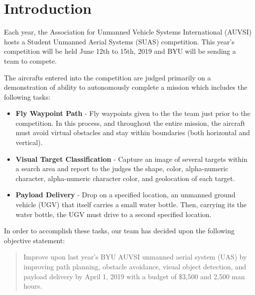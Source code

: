 \documentclass{auvsi_doc}
\begin{document}
\begin{AUVSITitlePage}
\begin{artifacttable}
\end{artifacttable}
\end{AUVSITitlePage}


\section{ Introduction}

Each year, the Association for Unmanned Vehicle Systems International (AUVSI) hosts a Student Unmanned Aerial Systems (SUAS) competition. This year’s competition will be held June 12th to 15th, 2019 and BYU will be sending a team to compete.

The aircrafts entered into the competition are judged primarily on a demonstration of ability to autonomously complete a mission which includes the following tasks:

\begin{itemize}
	\item\textbf{Fly Waypoint Path} - Fly waypoints given to the the team just prior to the competition. In this process, and throughout the entire mission, the aircraft must avoid virtual obstacles and stay within boundaries (both horizontal and vertical).
	\item\textbf{Visual Target Classification} - Capture an image of several targets within a search area and report to the judges the shape, color, alpha-numeric character, alpha-numeric character color, and geolocation of each target.
	\item\textbf{Payload Delivery} - Drop on a specified location, an unmanned ground vehicle (UGV) that itself carries a small water bottle. Then, carrying its the water bottle, the UGV must drive to a second specified location.
\end{itemize}

In order to accomplish these tasks, our team has decided upon the following objective statement:

\begin{quote}
Improve upon last year’s BYU AUVSI unmanned aerial system (UAS) by improving path planning, obstacle avoidance, visual object detection, and payload delivery by April 1, 2019 with a budget of \$3,500 and 2,500 man hours.
\end{quote}
\end{document}
